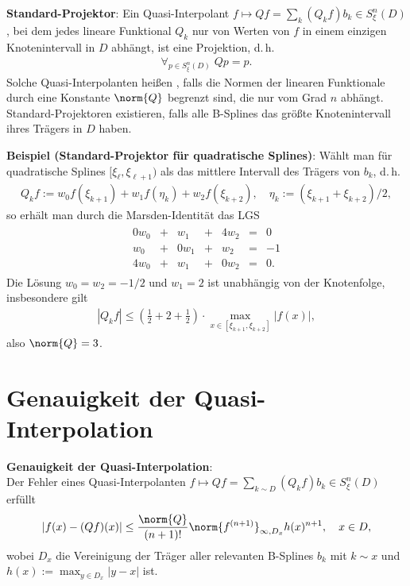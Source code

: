 \linie

\textbf{Standard-Projektor}:
Ein Quasi-Interpolant $f \mapsto Qf = \sum_k (Q_k f) b_k \in S_\xi^n(D)$,
bei dem jedes lineare Funktional $Q_k$ nur von Werten von $f$ in einem einzigen Knotenintervall in
$D$ abhängt, ist eine Projektion, d.\,h.
\begin{align*}
    \forall_{p \in S_\xi^n(D)}\; Qp = p.
\end{align*}
Solche Quasi-Interpolanten heißen , falls die Normen
der linearen Funktionale durch eine Konstante $\norm{Q}$ begrenzt sind, die nur vom Grad $n$
abhängt.
Standard-Projektoren existieren, falls alle B-Splines das größte Knotenintervall ihres
Trägers in $D$ haben.

\linie

\textbf{Beispiel (Standard-Projektor für quadratische Splines)}:
Wählt man für quadratische Splines $[\xi_\ell, \xi_{\ell+1})$ als das mittlere Intervall
des Trägers von $b_k$, d.\,h.
\begin{align*}
    Q_k f := w_0 f(\xi_{k+1}) + w_1 f(\eta_k) + w_2 f(\xi_{k+2}),\quad
    \eta_k := (\xi_{k+1} + \xi_{k+2})/2,
\end{align*}
so erhält man durch die Marsden-Identität das LGS
\begin{align*}
    \begin{array}{rcrcrcc}
        0w_0 & + & w_1 & + & 4w_2 & = & 0\\
        w_0 & + & 0w_1 & + & w_2 & = & -1\\
        4w_0 & + & w_1 & + & 0w_2 & = & 0.
    \end{array}
\end{align*}
Die Lösung $w_0 = w_2 = -1/2$ und $w_1 = 2$ ist unabhängig von der Knotenfolge, insbesondere gilt
\begin{align*}
    |Q_k f| \le \left(\frac{1}{2} + 2 + \frac{1}{2}\right) \cdot
    \max_{x \in [\xi_{k+1}, \xi_{k+2}]} |f(x)|,
\end{align*}
also $\norm{Q} = 3$.

\pagebreak

\section{%
    Genauigkeit der Quasi-Interpolation%
}

\textbf{Genauigkeit der Quasi-Interpolation}:\\
Der Fehler eines Quasi-Interpolanten
$f \mapsto Qf = \sum_{k \sim D} (Q_k f) b_k \in S_\xi^n(D)$
erfüllt
\begin{align*}
    |f(x) - (Qf)(x)| \le \frac{\norm{Q}}{(n + 1)!} \norm{f^{(n+1)}}_{\infty,D_x} h(x)^{n+1},\quad
    x \in D,
\end{align*}
wobei $D_x$ die Vereinigung der Träger aller relevanten B-Splines $b_k$ mit $k \sim x$ und\\
$h(x) := \max_{y \in D_x} |y - x|$ ist.

